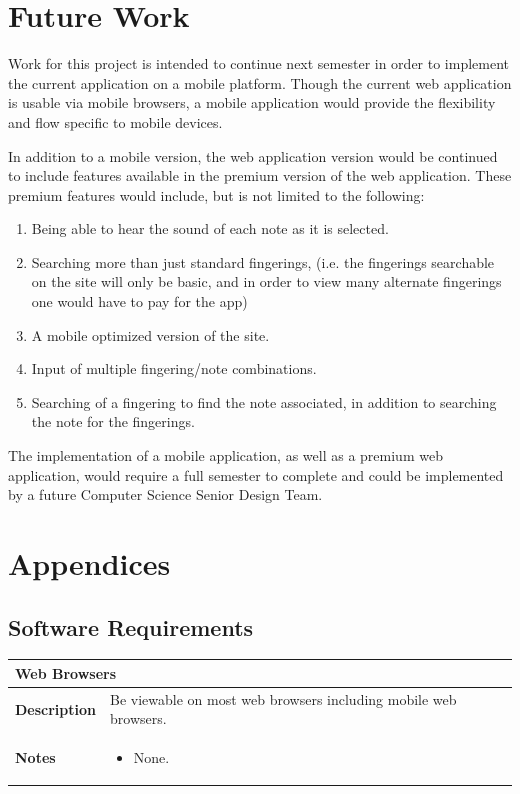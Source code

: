 \documentclass[12pt,english]{article}
\providecommand{\tabularnewline}{\\}
\providecommand{\tabularnewline}{\\}
\begin{document}
\section{Future Work}

Work for this project is intended to continue next semester in order
to implement the current application on a mobile platform. Though
the current web application is usable via mobile browsers, a mobile
application would provide the flexibility and flow specific to mobile
devices.

In addition to a mobile version, the web application version would
be continued to include features available in the premium version
of the web application. These premium features would include, but
is not limited to the following:
\begin{enumerate}
\item Being able to hear the sound of each note as it is selected. 
\item Searching more than just standard fingerings, (i.e. the fingerings
searchable on the site will only be basic, and in order to view many
alternate fingerings one would have to pay for the app) 
\item A mobile optimized version of the site. 
\item Input of multiple fingering/note combinations. 
\item Searching of a fingering to find the note associated, in addition
to searching the note for the fingerings. 
\end{enumerate}
The implementation of a mobile application, as well as a premium web
application, would require a full semester to complete and could be
implemented by a future Computer Science Senior Design Team. \clearpage{}


\section{Appendices}


\subsection{Software Requirements}

\begin{tabular}{|p{3cm}|p{13cm}|}
\hline 
\multicolumn{2}{|l|}{\textbf{Web Browsers}}\tabularnewline
\hline 
\textbf{Description}  & Be viewable on most web browsers including mobile web browsers. \tabularnewline
\hline 
\textbf{Notes}  & \begin{itemize}
\item None. \end{itemize}
\tabularnewline
\hline 
\end{tabular}\\[0.5cm]
\end{document}
